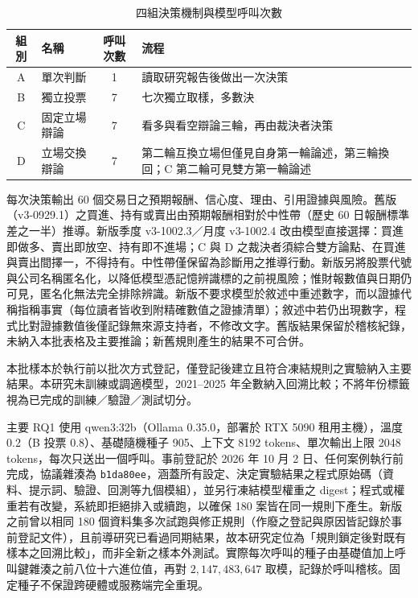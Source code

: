 \documentclass[12pt,a4paper]{article}
\newcommand{\grp}[1]{\textsf{#1}}
\begin{document}
\begin{CJK}{UTF8}{bkai}
\begin{table}[H]
\centering\small
\caption{四組決策機制與模型呼叫次數}
\label{tab:arms}
\begin{tabularx}{\textwidth}{@{}c l c Y@{}}
\toprule
組別 & 名稱 & 呼叫次數 & 流程 \\
\midrule
\grp{A} & 單次判斷 & 1 & 讀取研究報告後做出一次決策 \\
\grp{B} & 獨立投票 & 7 & 七次獨立取樣，多數決 \\
\grp{C} & 固定立場辯論 & 7 & 看多與看空辯論三輪，再由裁決者決策 \\
\grp{D} & 立場交換辯論 & 7 & 第二輪互換立場但僅見自身第一輪論述，第三輪換回；\grp{C} 第二輪可見雙方第一輪論述 \\
\bottomrule
\end{tabularx}
\end{table}

每次決策輸出 60 個交易日之預期報酬、信心度、理由、引用證據與風險。舊版（v3-0929.1）之買進、持有或賣出由預期報酬相對於中性帶（歷史 60 日報酬標準差之一半）推導。新版季度 v3-1002.3／月度 v3-1002.4 改由模型直接選擇：買進即做多、賣出即放空、持有即不進場；\grp{C} 與 \grp{D} 之裁決者須綜合雙方論點、在買進與賣出間擇一，不得持有。中性帶僅保留為診斷用之推導行動。新版另將股票代號與公司名稱匿名化，以降低模型憑記憶辨識標的之前視風險；惟財報數值與日期仍可見，匿名化無法完全排除辨識。新版不要求模型於敘述中重述數字，而以證據代稱指稱事實（每位讀者皆收到附精確數值之證據清單）；敘述中若仍出現數字，程式比對證據數值後僅記錄無來源支持者，不修改文字。舊版結果保留於稽核紀錄，未納入本批表格及主要推論；新舊規則產生的結果不可合併。

本批樣本於執行前以批次方式登記，僅登記後建立且符合凍結規則之實驗納入主要結果。本研究未訓練或調適模型，2021--2025 年全數納入回溯比較；不將年份標籤視為已完成的訓練／驗證／測試切分。

主要 RQ1 使用 qwen3:32b（Ollama 0.35.0，部署於 RTX 5090 租用主機），溫度 0.2（\grp{B} 投票 0.8）、基礎隨機種子 905、上下文 8192 tokens、單次輸出上限 2048 tokens，每次只送出一個呼叫。事前登記於 2026 年 10 月 2 日、任何案例執行前完成，協議雜湊為 \texttt{b1da80ee}，涵蓋所有設定、決定實驗結果之程式原始碼（資料、提示詞、驗證、回測等九個模組），並另行凍結模型權重之 digest；程式或權重若有改變，系統即拒絕排入或續跑，以確保 180 案皆在同一規則下產生。新版之前曾以相同 180 個資料集多次試跑與修正規則（作廢之登記與原因皆記錄於事前登記文件），且前導研究已看過同期結果，故本研究定位為「規則鎖定後對既有樣本之回溯比較」，而非全新之樣本外測試。實際每次呼叫的種子由基礎值加上呼叫鍵雜湊之前八位十六進位值，再對 $2{,}147{,}483{,}647$ 取模，記錄於呼叫稽核。固定種子不保證跨硬體或服務端完全重現。


\end{CJK}
\end{document}
